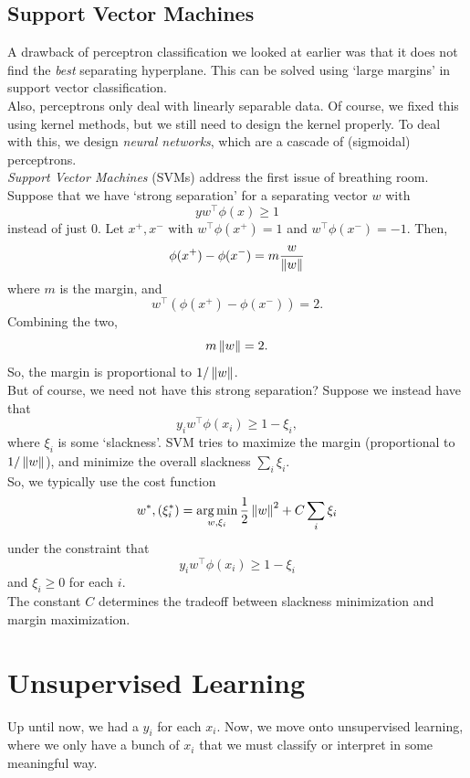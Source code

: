 \documentclass{article}
\begin{document}
	\subsection{Support Vector Machines}

		A drawback of perceptron classification we looked at earlier was that it does not find the \emph{best} separating hyperplane. This can be solved using `large margins' in support vector classification.\\
		Also, perceptrons only deal with linearly separable data. Of course, we fixed this using kernel methods, but we still need to design the kernel properly. To deal with this, we design \emph{neural networks}, which are a cascade of (sigmoidal) perceptrons.\\

		\emph{Support Vector Machines} (SVMs) address the first issue of breathing room. Suppose that we have `strong separation' for a separating vector $w$ with
		\[ yw^\top\phi(x) \ge 1 \]
		instead of just $0$. Let $x^+,x^-$ with $w^\top\phi(x^+) = 1$ and $w^\top\phi(x^-) = -1$. Then,
		\[ \phi(x^+) - \phi(x^-) = m \frac{w}{\left\lVert w\right\rVert} \]
		where $m$ is the margin, and
		\[ w^\top(\phi(x^+) - \phi(x^-)) = 2. \]
		Combining the two,
		\[ m\left\lVert w\right\rVert = 2. \]
		So, the margin is proportional to $1/\left\lVert w\right\rVert$.\\

		But of course, we need not have this strong separation? Suppose we instead have that 
		\[ y_i w^\top \phi(x_i) \ge 1 - \xi_i, \]
		where $\xi_i$ is some `slackness'. SVM tries to maximize the margin (proportional to $1/\left\lVert w\right\rVert$), and minimize the overall slackness $\sum_i \xi_i$.\\
		So, we typically use the cost function
		\[ w^*,(\xi_i^*) = \operatorname*{arg\,min}_{w,\xi_i} \frac{1}{2}\left\lVert w\right\rVert^2 + C \sum_i \xi_i \]
		under the constraint that
		\[ y_i w^\top\phi(x_i) \ge 1 - \xi_i \]
		and $\xi_i \ge 0$ for each $i$.\\
		The constant $C$ determines the tradeoff between slackness minimization and margin maximization.


\clearpage

\section{Unsupervised Learning}

	Up until now, we had a $y_i$ for each $x_i$. Now, we move onto unsupervised learning, where we only have a bunch of $x_i$ that we must classify or interpret in some meaningful way.
\end{document}
